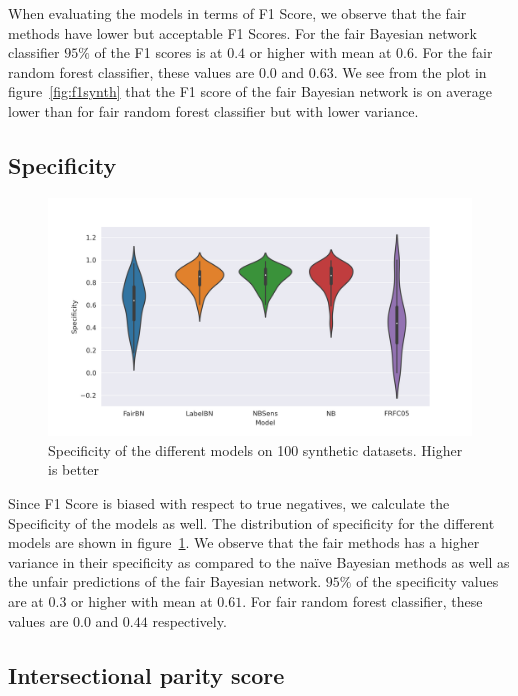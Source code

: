 When evaluating the models in terms of F1 Score, we observe that the fair methods have lower but acceptable F1 Scores. For the fair Bayesian network classifier $95\%$ of the F1 scores is at $0.4$ or higher with mean at $0.6$. For the fair random forest classifier, these values are $0.0$ and $0.63$. We see from the plot in figure~\ref{fig:f1synth} that the F1 score of the fair Bayesian network is on average lower than for fair random forest classifier but with lower variance.

\subsection{Specificity}

\begin{figure}
    \centering
    \includegraphics[width=\linewidth]{figures/Specificity-synthetic.png}
    \caption{Specificity of the different models on 100 synthetic datasets. Higher is better}
    \label{fig:specsynth}
\end{figure}

Since F1 Score is biased with respect to true negatives, we calculate the Specificity of the models as well. The distribution of specificity for the different models are shown in figure~\ref{fig:specsynth}. We observe that the fair methods has a higher variance in their specificity as compared to the naïve Bayesian methods as well as the unfair predictions of the fair Bayesian network. $95\%$ of the specificity values are at $0.3$ or higher with mean at $0.61$. For fair random forest classifier, these values are $0.0$ and $0.44$ respectively.

\subsection{Intersectional parity score}

